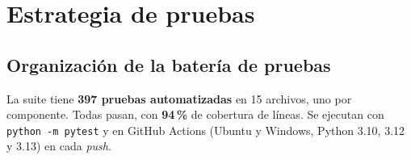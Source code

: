 \section{Estrategia de pruebas}
\label{sec:pruebas}

\subsection{Organización de la batería de pruebas}

La suite tiene \textbf{397 pruebas automatizadas} en 15 archivos, uno por
componente. Todas pasan, con \textbf{94\,\%} de cobertura de líneas. Se ejecutan
con \texttt{python -m pytest} y en GitHub Actions (Ubuntu y Windows, Python 3.10,
3.12 y 3.13) en cada \emph{push}.

